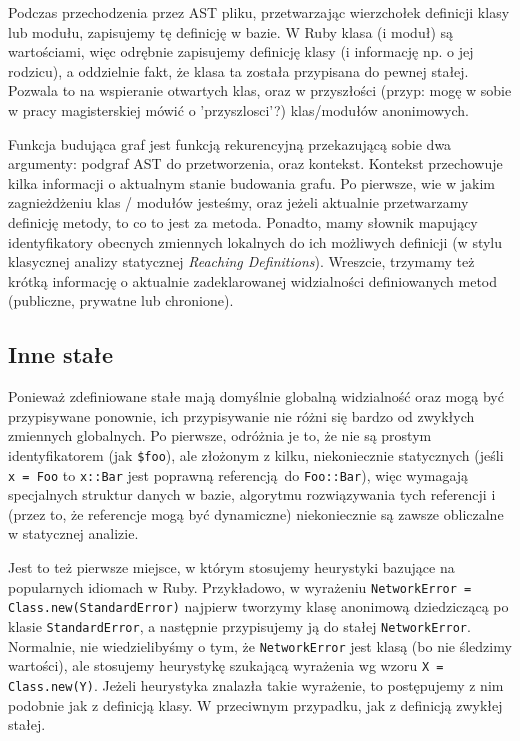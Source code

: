 \documentclass[declaration,shortabstract]{iithesis}
\begin{document}
Podczas przechodzenia przez AST pliku, przetwarzając wierzchołek definicji klasy lub modułu, zapisujemy tę definicję w bazie. W Ruby klasa (i moduł) są wartościami, więc odrębnie zapisujemy definicję klasy (i informację np. o jej rodzicu), a oddzielnie fakt, że klasa ta została przypisana do pewnej stałej. Pozwala to na wspieranie otwartych klas, oraz w przyszłości (przyp: mogę w sobie w pracy magisterskiej mówić o 'przyszlosci'?) klas/modułów anonimowych.

Funkcja budująca graf jest funkcją rekurencyjną przekazującą sobie dwa argumenty: podgraf AST do przetworzenia, oraz kontekst. Kontekst przechowuje kilka informacji o aktualnym stanie budowania grafu. Po pierwsze, wie w jakim zagnieżdżeniu klas / modułów jesteśmy, oraz jeżeli aktualnie przetwarzamy definicję metody, to co to jest za metoda. Ponadto, mamy słownik mapujący identyfikatory obecnych zmiennych lokalnych do ich możliwych definicji (w stylu klasycznej analizy statycznej \textit{Reaching Definitions}). Wreszcie, trzymamy też krótką informację o aktualnie zadeklarowanej widzialności definiowanych metod (publiczne, prywatne lub chronione).

\subsection{Inne stałe}

Ponieważ zdefiniowane stałe mają domyślnie globalną widzialność oraz mogą być przypisywane ponownie, ich przypisywanie nie różni się bardzo od zwykłych zmiennych globalnych. Po pierwsze, odróżnia je to, że nie są prostym identyfikatorem (jak \texttt{\$foo}), ale złożonym z kilku, niekoniecznie statycznych (jeśli \texttt{x = Foo} to \texttt{x::Bar} jest poprawną referencją do \texttt{Foo::Bar}), więc wymagają specjalnych struktur danych w bazie, algorytmu rozwiązywania tych referencji i (przez to, że referencje mogą być dynamiczne) niekoniecznie są zawsze obliczalne w statycznej analizie.

Jest to też pierwsze miejsce, w którym stosujemy heurystyki bazujące na popularnych idiomach w Ruby. Przykładowo, w wyrażeniu \texttt{NetworkError = Class.new(StandardError)} najpierw tworzymy klasę anonimową dziedziczącą po klasie \texttt{StandardError}, a następnie przypisujemy ją do stałej \texttt{NetworkError}. Normalnie, nie wiedzielibyśmy o tym, że \texttt{NetworkError} jest klasą (bo nie śledzimy wartości), ale stosujemy heurystykę szukającą wyrażenia wg wzoru \texttt{X = Class.new(Y)}. Jeżeli heurystyka znalazła takie wyrażenie, to postępujemy z nim podobnie jak z definicją klasy. W przeciwnym przypadku, jak z definicją zwykłej stałej.
\end{document}
